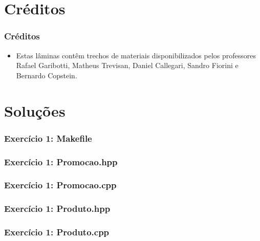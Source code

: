 \documentclass[aspectratio=169]{beamer}
\begin{document}
\section{Créditos}

\begin{frame}\frametitle{Créditos}
\begin{itemize}
	\item Estas lâminas contêm trechos de materiais disponibilizados pelos professores Rafael Garibotti, Matheus Trevisan, Daniel Callegari, Sandro Fiorini e Bernardo Copstein.
\end{itemize}
\end{frame}

\section{Soluções}

\begin{frame}[fragile]\frametitle{Exercício 1: Makefile}
\fontsize{3pt}{5pt}\selectfont{

}
\end{frame}

\begin{frame}[fragile]\frametitle{Exercício 1: Promocao.hpp}

\end{frame}

\begin{frame}[fragile]\frametitle{Exercício 1: Promocao.cpp}
\fontsize{3pt}{5pt}\selectfont{

}
\end{frame}

\begin{frame}[fragile]\frametitle{Exercício 1: Produto.hpp}

\end{frame}

\begin{frame}[fragile]\frametitle{Exercício 1: Produto.cpp}
\fontsize{3pt}{5pt}\selectfont{

}
\end{frame}
\end{document}
